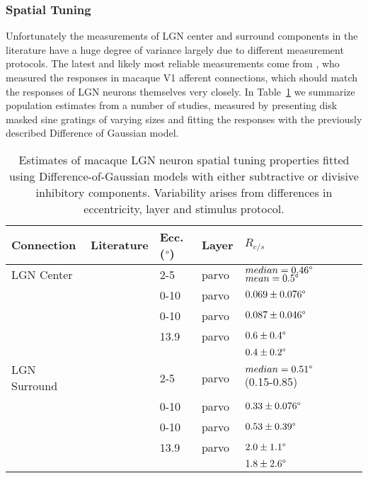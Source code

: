 \subsubsection{Spatial Tuning}

Unfortunately the measurements of LGN center and surround components
in the literature have a huge degree of variance largely due to
different measurement protocols. The latest and likely most reliable
measurements come from \citep{Sceniak2006}, who measured the responses
in macaque V1 afferent connections, which should match the responses
of LGN neurons themselves very closely. In Table~\ref{LGNEstimates} we
summarize population estimates from a number of studies, measured by
presenting disk masked sine gratings of varying sizes and fitting the
responses with the previously described Difference of Gaussian model.

\begin{table}
  \centering
  \begin{adjustbox}{width=1\textwidth}
  \begin{tabular}{l | l l l l l l}
    Connection   & Literature            & Ecc. ($\degree$) & Layer & $R_{c/s}$ \\
    \hline
    LGN Center   & \cite{Sceniak2006}    & 2-5  & parvo & $median = 0.46\degree$ $mean = 0.5\degree$ \\
                 & \cite{Levitt2001}     & 0-10 & parvo & $0.069 \pm 0.076\degree$ \\
                 & \cite{Spear1994}      & 0-10 & parvo & $0.087 \pm 0.046\degree$ \\
                 & \cite{Bonin2005}      & 13.9 & parvo & $0.6 \pm 0.4\degree$\\
                 &                       &      &       & $0.4 \pm 0.2\degree$ \\
    \hline
    LGN Surround & \cite{Sceniak2006}    & 2-5  & parvo & $median = 0.51\degree$ (0.15-0.85) \\
                 & \cite{Levitt2001}     & 0-10 & parvo & $0.33 \pm 0.076\degree$ \\
                 & \cite{Spear1994}      & 0-10 & parvo & $0.53 \pm 0.39\degree$ \\
                 & \cite{Bonin2005}      & 13.9 & parvo & $2.0 \pm 1.1\degree$\\
                 &                       &      &       & $1.8 \pm 2.6\degree$\\

    \hline
  \end{tabular}
  \end{adjustbox}
  \caption[Estimates of macaque LGN spatial tuning.]{Estimates of
    macaque LGN neuron spatial tuning properties fitted using
    Difference-of-Gaussian models with either subtractive or divisive
    inhibitory components. Variability arises from differences in
    eccentricity, layer and stimulus protocol.}
  \label{LGNEstimates}
\end{table}

